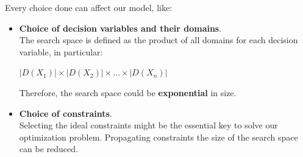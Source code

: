 Every choice done can affect our model, like:
\begin{itemize}
    \renewcommand{\labelitemi}{-}
    \item \textbf{Choice of decision variables and their domains}. \\ The search space is defined as the product of all domains for each decision variable, in particular: \vspace{3.5pt}
    \begin{center}
        $|D(X_1)| \times |D(X_2)| \times \dots \times |D(X_n)|$
    \end{center} \vspace{3.5pt}
    Therefore, the search space could be \textbf{exponential} in size.
    \item \textbf{Choice of constraints}. \\ Selecting the ideal constraints might be the essential key to solve our optimization problem. Propagating constraints the size of the search space can be reduced.
\end{itemize}
